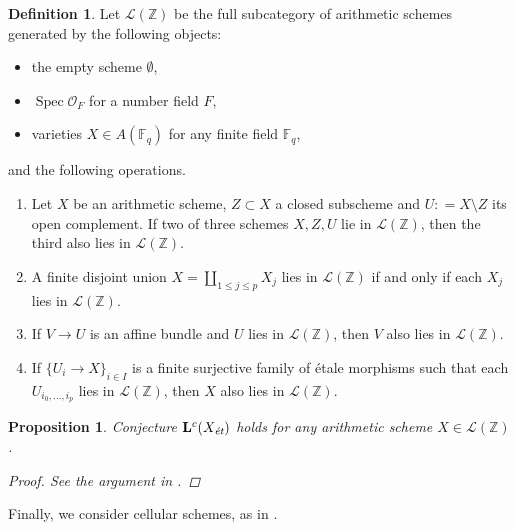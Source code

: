 \documentclass[leqno,12pt]{article}
\theoremstyle{plain}
\newtheorem{proposition}[theorem]{\indent\sc Proposition}
\theoremstyle{definition}
\newtheorem{definition}[theorem]{\indent\sc Definition}
\DeclareMathOperator{\Spec}{Spec}
\newcommand{\FF}{\mathbb{F}}
\newcommand{\ZZ}{\mathbb{Z}}
\newcommand{\dfn}{\mathrel{\mathop:}=}
\newcommand{\et}{\text{\it \'{e}t}}
\begin{document}
\begin{definition}
  Let $\mathcal{L} (\ZZ)$ be the full subcategory of arithmetic schemes
  generated by the following objects:
  \begin{itemize}
  \item the empty scheme $\emptyset$,
  \item $\Spec \mathcal{O}_F$ for a number field $F$,
  \item varieties $X \in A (\FF_q)$ for any finite field $\FF_q$,
  \end{itemize}
  and the following operations.
  \begin{enumerate}
  \item[$\mathcal{L}$1)] Let $X$ be an arithmetic scheme, $Z \subset X$ a closed
    subscheme and $U \dfn X\setminus Z$ its open complement. If two of three
    schemes $X,Z,U$ lie in $\mathcal{L} (\ZZ)$, then the third also lies in
    $\mathcal{L} (\ZZ)$.

  \item[$\mathcal{L}$2)] A finite disjoint union
    $X = \coprod_{1 \le j \le p} X_j$ lies in $\mathcal{L} (\ZZ)$ if and only if
    each $X_j$ lies in $\mathcal{L} (\ZZ)$.

  \item[$\mathcal{L}$3)] If $V \to U$ is an affine bundle and $U$ lies in
    $\mathcal{L} (\ZZ)$, then $V$ also lies in $\mathcal{L} (\ZZ)$.

  \item[$\mathcal{L}$4)] If $\{ U_i \to X \}_{i \in I}$ is a finite surjective
    family of \'{e}tale morphisms such that each $U_{i_0,\ldots,i_p}$ lies in
    $\mathcal{L} (\ZZ)$, then $X$ also lies in $\mathcal{L} (\ZZ)$.
  \end{enumerate}
\end{definition}

\begin{proposition}
  Conjecture $\mathbf{L}^c (X_\et)$ holds for any arithmetic scheme
  $X \in \mathcal{L} (\ZZ)$.

  \begin{proof}
    See the argument in \cite[Proposition~5.10]{Morin-2014}.
  \end{proof}
\end{proposition}

Finally, we consider cellular schemes, as in \cite[\S 5.4]{Morin-2014}.
\end{document}
